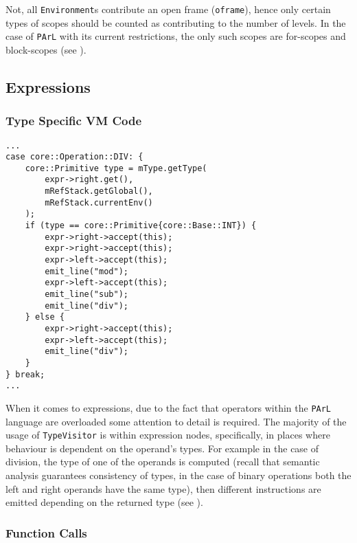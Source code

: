 \begin{note}
Not, all \texttt{Environment}s contribute an open frame
(\texttt{oframe}), hence only certain types of scopes should be
counted as contributing to the number of levels. In the case of
\texttt{PArL} with its current restrictions, the only such
scopes are for-scopes and block-scopes (see
).
\end{note}

\subsection{Expressions}

\subsubsection{Type Specific VM Code}

\begin{lstlisting}[caption={A segment of the
\texttt{visit(Binary *)} method in the \texttt{GenVisitor} class
(ir\_gen/GenVisitor.cpp).}, label=lst:overloadeddiv]
...
case core::Operation::DIV: {
    core::Primitive type = mType.getType(
        expr->right.get(),
        mRefStack.getGlobal(),
        mRefStack.currentEnv()
    );
    if (type == core::Primitive{core::Base::INT}) {
        expr->right->accept(this);
        expr->right->accept(this);
        expr->left->accept(this);
        emit_line("mod");
        expr->left->accept(this);
        emit_line("sub");
        emit_line("div");
    } else {
        expr->right->accept(this);
        expr->left->accept(this);
        emit_line("div");
    }
} break;
...
\end{lstlisting}

When it comes to expressions, due to the fact that operators
within the \texttt{PArL} language are overloaded some attention
to detail is required. The majority of the usage of
\texttt{TypeVisitor} is within expression nodes, specifically,
in places where behaviour is dependent on the operand's types.
For example in the case of division, the type of one of the
operands is computed (recall that semantic analysis guarantees
consistency of types, in the case of binary operations both the
left and right operands have the same type), then different
instructions are emitted depending on the returned type (see
).

\subsubsection{Function Calls}

